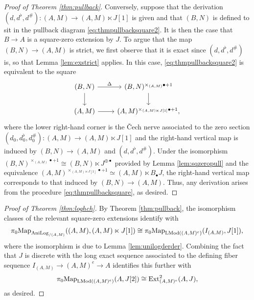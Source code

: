 \documentclass[a4paper,10pt%
]{amsart}
\numberwithin{equation}{section}
\theoremstyle{definition}
\renewcommand{\:}{\colon}
\begin{document}
\begin{proof}[Proof of Theorem \ref{thm:pullback}]
Conversely, suppose that the derivation $(d, d^\flat, d^\#) \colon (A, M) \to (A, M) \ltimes J[1]$ is given and that $(B, N)$ is defined to sit in the pullback diagram \eqref{eq:thmpullbacksquare2}. It is then the case that $B \to A$ is a square-zero extension by $J$. To argue that the map $(B, N) \to (A, M)$ is strict, we first observe that it is exact since $(d, d^\flat, d^\#)$ is, so that Lemma \ref{lem:exstrict} applies. In this case, \eqref{eq:thmpullbacksquare2} is equivalent to the square \[\begin{tikzcd}(B, N) \ar{r}{\Delta} \ar{d} & (B, N)^{\times_{(A, M)} \bullet + 1} \ar{d} \\ (A, M) \ar{r}{} & (A, M)^{\times_{(A, M) \ltimes J[1]} \bullet + 1},\end{tikzcd}\] where the lower right-hand corner is the \v{C}ech nerve associated to the zero section $(d_0, d_0^\flat, d_0^\#) \colon (A, M) \to (A, M) \ltimes J[1]$ and the right-hand vertical map is induced by $(B, N) \to (A, M)$ and $(d, d^\flat, d^\#)$. Under the isomorphism $(B, N)^{\times_{(A, M)} \bullet + 1} \cong (B, N) \ltimes J^{\oplus \bullet}$ provided by Lemma \ref{lem:sqzeropull} and the equivalence $(A, M)^{\times_{(A, M) \ltimes J[1]} \bullet + 1} \simeq (A, M) \ltimes B_{\bullet}J$, the right-hand vertical map corresponds to that induced by $(B, N) \to (A, M)$. Thus, any derivation arises from the procedure \eqref{eq:thmpullbacksquare}, as desired. 
\end{proof}

\begin{proof}[Proof of Theorem \ref{thm:loghch}] By Theorem \ref{thm:pullback}, the isomorphism classes of the relevant square-zero extensions identify with \[\pi_0{\rm Map}_{{\rm AniLog}_{/(A, M)}}((A, M), (A, M) \ltimes J[1]) \cong \pi_0{\rm Map}_{{\rm LMod}((A, M)^e)}(I_{(A, M)}, J[1]),\] where the isomorphism is due to Lemma \ref{lem:unilogderder}. Combining the fact that $J$ is discrete with the long exact sequence associated to the defining fiber sequence $I_{(A, M)} \to (A, M)^e \to A$ identifies this further with \[\pi_0{{\rm Map}_{{\rm LMod}((A, M)^e)}}(A, J[2]) \cong {\rm Ext}^2_{(A, M)^e}(A, J),\] as desired. 
\end{proof}
\end{document}
